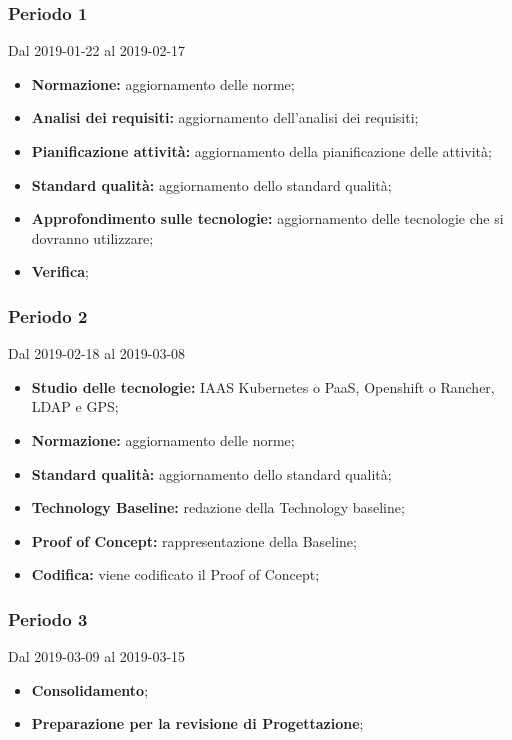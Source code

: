 \subsubsection{Periodo 1} 
Dal 2019-01-22 al 2019-02-17
\begin{itemize}
	\item \textbf{Normazione:} aggiornamento delle norme;
	\item \textbf{Analisi dei requisiti:} aggiornamento dell'analisi dei requisiti;
	\item \textbf{Pianificazione attività:} aggiornamento della pianificazione delle attività;
	\item \textbf{Standard qualità:} aggiornamento dello standard qualità;
	\item \textbf{Approfondimento sulle tecnologie:} aggiornamento delle tecnologie che si dovranno utilizzare;
	\item \textbf{Verifica};
\end{itemize}
\subsubsection{Periodo 2} 
Dal 2019-02-18 al 2019-03-08
\begin{itemize}
	\item \textbf{Studio delle tecnologie:} IAAS Kubernetes o PaaS, Openshift o Rancher, LDAP e GPS;
	\item \textbf{Normazione:} aggiornamento delle norme;
	\item \textbf{Standard qualità:} aggiornamento dello standard qualità;
	\item \textbf{Technology Baseline:} redazione della Technology baseline;
	\item \textbf{Proof of Concept:} rappresentazione della Baseline;
	\item \textbf{Codifica:} viene codificato il Proof of Concept;
\end{itemize}
\subsubsection{Periodo 3} 
Dal 2019-03-09 al 2019-03-15
\begin{itemize}
	\item \textbf{Consolidamento};
	\item \textbf{Preparazione per la revisione di Progettazione};
\end{itemize}

